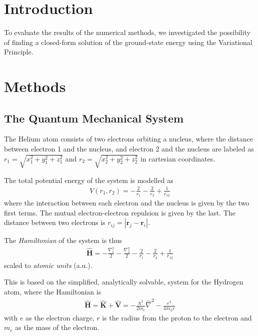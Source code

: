 \documentclass[twocolumns, a4paper,11pt,fleqn]{extarticle}
\title{}
\newcommand{\eq}[1]{{\small\begin{align*}#1\end{align*}}}
\newcommand{\equ}[1]{{\small\begin{align}#1\end{align}}}
\renewcommand\vec[1]{\boldsymbol{\mathbf{#1}}}
\newcommand{\OP}[1]{\mathbf{\widehat{#1}}}
\newcommand{\op}[1]{\hat{#1}}
\begin{document}

\section{Introduction}
To evaluate the results of the numerical methods, we investigated the possibility
of finding a closed-form solution of the ground-state energy 
using the Variational Principle.

\section{Methods}
\subsection{The Quantum Mechanical System}
The Helium atom consists of two electrons orbiting a nucleus,
where the distance between electron 1 and the nucleus,
and electron 2 and the nucleus are labeled as
$r_1 = \sqrt{x_1^2 + y_1^2 + z_1^2}$ 
and $r_2 = \sqrt{x_2^2 + y_2^2 + z_2^2}$ in cartesian coordinates.

The total potential energy of the system is modelled as
{\small
\eq{
    V(r_1,r_2)=-\frac{2}{r_1}-\frac{2}{r_2}+\frac{1}{r_{12}}
}}%
where the interaction between each electron and the nucleus
is given by the two first terms. 
The mutual electron-electron repulsion is given by the last.
The distance between two electrons is $r_{ij}=|\vec r_j-\vec r_i|$.

The \textit{Hamiltonian} of the system is thus
\eq{
    \OP H = -\frac{\nabla_1 ^2}{2} -\frac{\nabla_2 ^2}{2}
    -\frac{2}{r_1}-\frac{2}{r_2}+\frac{1}{r_{12}}
}
scaled to \textit{atomic units} (a.u.).

This is based on the simplified, analytically solvable, system for the 
Hydrogen atom, where the Hamiltonian is
\equ{
  \OP H = \OP K + \OP V = -\frac{\hbar^2}{2m_e}\op \nabla^2 
  - \frac{e^2}{4\pi \epsilon_0 r} \label{eq:hydro}
}
with $e$ as the electron charge, $r$ is the radius from the proton to the electron
and $m_e$ as the mass of the electron.
\end{document}
